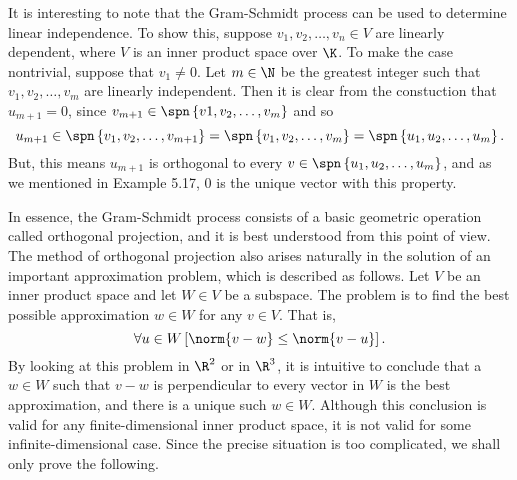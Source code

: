 \documentclass[linearalgebraII]{subfiles}
\begin{document}
    \begin{remark}
        It is interesting to note that the Gram-Schmidt process can be used to determine linear independence. To show this, suppose $v_1,v_2,\ldots,v_n\in V$ are linearly dependent, where $V$ is an inner product space over $\K$. To make the case nontrivial, suppose that $v_1\neq 0$. Let $m\in\N$ be the greatest integer such that $v_1,v_2,\ldots,v_m$ are linearly independent. Then it is clear from the constuction that $u_{m+1} = 0$, since $v_{m+1}\in\spn\left\lbrace v1,v_2,\ldots,v_m \right\rbrace$ and so
        \begin{equation*}
            u_{m+1}\in \spn\left\lbrace v_1,v_2,\ldots,v_{m+1} \right\rbrace = \spn\left\lbrace v_1,v_2,\ldots,v_m \right\rbrace = \spn\left\lbrace u_1,u_2,\ldots,u_m \right\rbrace .
        \end{equation*}
        But, this means $u_{m+1}$ is orthogonal to every $v\in\spn\left\lbrace u_1,u_2,\ldots,u_m \right\rbrace$, and as we mentioned in Example 5.17, $0$ is the unique vector with this property.
    \end{remark}

    \begin{remark}
        In essence, the Gram-Schmidt process consists of a basic geometric operation called orthogonal projection, and it is best understood from this point of view. The method of orthogonal projection also arises naturally in the solution of an important approximation problem, which is described as follows. Let $V$ be an inner product space and let $W\in V$ be a subspace. The problem is to find the best possible approximation $w\in W$ for any $v\in V$. That is,
        \begin{equation*}
            \forall u\in W\left[ \norm{v-w}\leq \norm{v-u} \right].
        \end{equation*}
        By looking at this problem in $\R^2$ or in $\R^3$, it is intuitive to conclude that a $w\in W$ such that $v-w$ is perpendicular to every vector in $W$ is the best approximation, and there is a unique such $w\in W$. Although this conclusion is valid for any finite-dimensional inner product space, it is not valid for some infinite-dimensional case. Since the precise situation is too complicated, we shall only prove the following.
    \end{remark}
\end{document}
